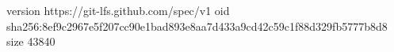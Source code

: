 version https://git-lfs.github.com/spec/v1
oid sha256:8ef9c2967e5f207cc90e1bad893e8aa7d433a9cd42c59c1f88d329fb5777b8d8
size 43840
